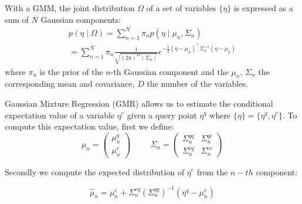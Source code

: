 \begin{table}
    \colorbox{light-gray}{
        \begin{minipage}[t]{0.45\textwidth}

           With a GMM, the joint distribution $\Omega$ of a set of variables $\{\eta\}$ is expressed as a sum of $N$ Gaussian components:
           \begin{equation}
           \begin{split}
            p\left(\eta\mid\Omega\right) = \sum_{n=1}^N \pi_n p\left(\eta\mid\mu_n,\Sigma_n\right) \\
            = \sum_{n=1}^N \pi_n \frac{1}{\sqrt{\left(2\pi\right)^D \mid\Sigma_n\mid }} e^{-\frac{1}{2}\left(\eta-\mu_n\right)^{\top} \Sigma^{-1}_n \left(\eta-\mu_n\right)}
           \end{split}
           \end{equation}
           where $\pi_n$ is the prior of the $n$-th Gaussian component and the ${\mu}_n$, ${\Sigma}_n$ the corresponding mean and covariance, $D$ the number of the variables.


            Gaussian Mixture Regression (GMR) allows us to estimate the conditional expectation value of a variable $\eta^e$ given a query point $\eta^q$ where $\{\eta\} = \{\eta^q, \eta^e\}$. To compute this expectation value, first we define:
            \begin{equation}
            {
             {\mu}_{n} = \begin{pmatrix} {\mu}_{n}^q    \\
                                         {\mu}_{n}^e
                         \end{pmatrix}
            }
            \hspace{1cm}
            {
            {\Sigma}_{n} =  \begin{pmatrix} {\Sigma}_{n}^{qq}  & {\Sigma}_{n}^{qe}  \\
                                            {\Sigma}_{n}^{eq} & {\Sigma}_{n}^{ee}
                            \end{pmatrix}
            }
            \end{equation}

            Secondly we compute the expected distribution of $\eta^e$ from the $n-th$ component:

            \begin{equation}
            {
            \hat{\mu}_{n} = {\mu}_{n}^e + \Sigma_{n}^{eq}({\Sigma}_{n}^{qq})^{-1}(\eta^q-{\mu}_{n}^e)
            }
            \end{equation}


\end{minipage}}
\end{table}
